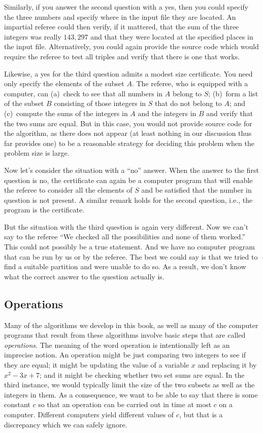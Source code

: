 Similarly, if you answer the second question with a yes,
then you could specify the three numbers and specify where in
the input file they are located.  An impartial referee could then
verify, if it mattered, that the sum of the three integers was
really $143,297$ and that they were located at the specified places
in the input file.  Alternatively, you could again provide the source
code which would require the referee to test all triples and
verify that there is one that works.

Likewise, a yes for the third question admits a modest size
certificate.  You need only specify the elements of the subset $A$.
The referee, who is equipped with a computer, can (a)~check to see that
all numbers in $A$ belong to $S$; (b)~form a list of the subset $B$ consisting
of those integers in $S$ that do not belong to $A$; and (c)~compute
the sums of the integers in $A$ and the integers in $B$ and verify that
the two sums are equal.  But in this case, you would not provide 
source code for the algorithm, as there does not appear (at least nothing
in our discussion thus far provides one) to be a reasonable strategy
for deciding this problem when the problem size is large.

Now let's consider the situation with a ``no'' answer.  When the answer
to the first question is no, the certificate can again be a computer program
that will enable the referee to consider all the elements of $S$ and
be satisfied that the number in question is not present.  A similar
remark holds for the second question, i.e., the program is the certificate.

But the situation with the third question is again very different.
Now we can't say to the referee ``We checked all the possibilities and
none of them worked.''  This could not possibly be a true statement.
And we have no computer program that can be run by us or by the 
referee.  The best we could say is that we tried to find a suitable partition 
and were unable to do so. As a result, we don't know what the correct answer 
to the question actually is.

\subsection{Operations}

Many of the algorithms we develop in this book, as well as many of
the computer programs that result from these algorithms involve
basic steps that are called \textit{operations}.  The meaning of
the word operation is intentionally left as an imprecise notion.
An operation might be just comparing two integers to see if they
are equal; it might be updating the value of a variable $x$ and
replacing it by $x^2-3x+7$; and it might be checking whether two
set sums are equal.  In the third instance, we would typically
limit the size of the two subsets as well as the integers in them.
As a comsequence, we want to be able to say that there is some
constant $c$ so that an operation can be carried out in time
at most $c$ on a computer. Different computers yield different
values of $c$, but that is a discrepancy which we can safely ignore.

